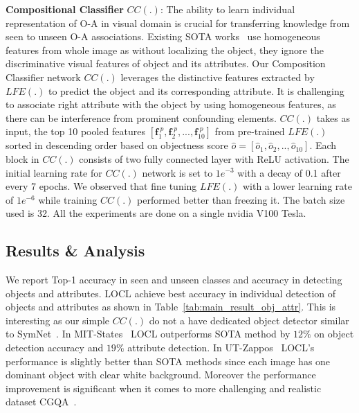 \documentclass{bmvc2k}
\begin{document}
\textbf{Compositional Classifier} $CC(.)$: The ability to learn individual representation of O-A in visual domain is crucial for transferring knowledge from seen to unseen O-A associations. Existing SOTA works~\cite{naeem2021learning,mancini2021learning,mancini2021open,ruis2021independent,xu2021zero} use homogeneous features from whole image as without localizing the object, they ignore the discriminative visual features of object and its attributes. Our Composition Classifier network $CC(.)$ leverages the distinctive features extracted by $LFE(.)$ to predict the object and its corresponding attribute.
It is challenging to associate right attribute with the object by using homogeneous features, as there can be interference from prominent confounding elements.
$CC(.)$ takes as input, the top 10 pooled features $[\textbf{f}^{\;p}_1, \textbf{f}^{\;p}_2, ..., \textbf{f}^{\;p}_{10}]$ from pre-trained $LFE(.)$ sorted in descending order based on objectness score $\hat{o} = [\hat{o}_1, \hat{o}_2, .., \hat{o}_{10}]$. Each block in $CC(.)$ consists of two fully connected layer with ReLU activation. The initial learning rate for $CC(.)$ network is set to $1e^{-3}$ with a decay of 0.1 after every 7 epochs. We observed that fine tuning $LFE(.)$ with a lower learning rate of $1e^{-6}$ while training  $CC(.)$ performed better than freezing it. The batch size used is 32. All the experiments are done on a single nvidia V100 Tesla.

\subsection{Results \& Analysis}

We report Top-1 accuracy in seen and unseen classes and accuracy in detecting objects and attributes. LOCL achieve best accuracy in individual detection of objects and attributes as shown in Table~\ref{tab:main_result_obj_attr}. This is interesting as our simple $CC(.)$ do not a have dedicated object detector similar to SymNet~\cite{li2020symmetry}.
In MIT-States~\cite{isola2015discovering} LOCL outperforms SOTA method by $12\%$ on object detection accuracy and $19\%$ attribute detection. 
In UT-Zappos~\cite{yu2017semantic} LOCL's performance is slightly better than SOTA methods since each image has one dominant object with clear white background. Moreover the performance improvement is significant when it comes to more challenging and realistic dataset CGQA~\cite{naeem2021learning}. 
\end{document}
